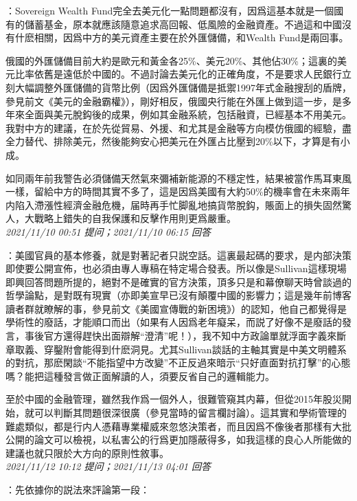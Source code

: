 \documentclass[twocolumn]{ctexart}
\begin{document}
：Sovereign Wealth Fund完全去美元化一點問題都沒有，因爲這基本就是一個國有的儲蓄基金，原本就應該隨意追求高回報、低風險的金融資產。不過這和中國沒有什麽相關，因爲中方的美元資產主要在於外匯儲備，和Wealth Fund是兩回事。

俄國的外匯儲備目前大約是歐元和黃金各25\%、美元20\%、其他佔30\%；這裏的美元比率依舊是遠低於中國的。不過討論去美元化的正確角度，不是要求人民銀行立刻大幅調整外匯儲備的貨幣比例（因爲外匯儲備是抵禦1997年式金融搜刮的盾牌，參見前文《美元的金融霸權》），剛好相反，俄國央行能在外匯上做到這一步，是多年來全面與美元脫鈎後的成果，例如其金融系統，包括融資，已經基本不用美元。我對中方的建議，在於先從貿易、外援、和尤其是金融等方向模仿俄國的經驗，盡全力替代、排除美元，然後能夠安心把美元在外匯占比壓到20\%以下，才算是有小成。

如同兩年前我警告必須儲備天然氣來彌補新能源的不穩定性，結果被當作馬耳東風一樣，留給中方的時間其實不多了，這是因爲美國有大約50\%的機率會在未來兩年内陷入滯漲性經濟金融危機，届時再手忙脚亂地搞貨幣脫鈎，賬面上的損失固然驚人，大戰略上錯失的自我保護和反擊作用則更爲嚴重。
\\

\textit{\hfill\noindent\small 2021/11/10 00:51 提问；2021/11/10 06:15 回答}

：美國官員的基本修養，就是對著記者只説空話。這裏最起碼的要求，是内部決策即使要公開宣佈，也必須由專人專稿在特定場合發表。所以像是Sullivan這樣現場即興回答問題所提的，絕對不是確實的官方決策，頂多只是和幕僚聊天時曾談過的哲學論點，是對既有現實（亦即美宣早已沒有顛覆中國的影響力；這是幾年前博客讀者群就瞭解的事，參見前文《美國宣傳戰的新困境》）的認知，他自己都覺得是學術性的廢話，才能順口而出（如果有人因爲老年癡呆，而説了好像不是廢話的發言，事後官方還得趕快出面辯解“澄清”呢！），我不知中方政論單就浮面字義來斷章取義、穿鑿附會能得到什麽洞見。尤其Sullivan談話的主軸其實是中美文明體系的對抗，那麽閑談“不能指望中方改變”不正反過來暗示“只好直面對抗打擊”的心態嗎？能把這種發言做正面解讀的人，須要反省自己的邏輯能力。

至於中國的金融管理，雖然我作爲一個外人，很難管窺其内幕，但從2015年股災開始，就可以判斷其問題很深很廣（參見當時的留言欄討論）。這其實和學術管理的難處類似，都是行内人憑藉專業權威來忽悠決策者，而且因爲不像後者那樣有大批公開的論文可以檢視，以私害公的行爲更加隱蔽得多，如我這樣的良心人所能做的建議也就只限於大方向的原則性敘事。
\\

\textit{\hfill\noindent\small 2021/11/12 10:12 提问；2021/11/13 04:01 回答}

：先依據你的説法來評論第一段：
\end{document}
